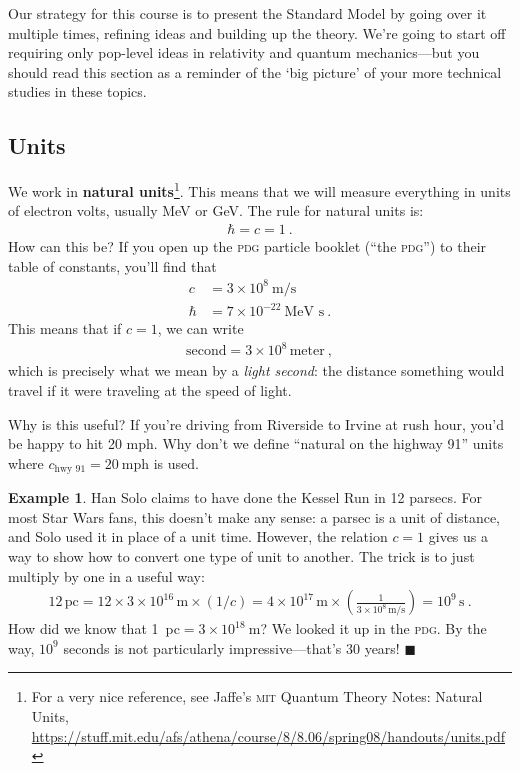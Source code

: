 \documentclass[12pt]{article}
\numberwithin{equation}{section}    %
\newcommand{\acro}[1]{\textsc{\MakeLowercase{#1}}}
\theoremstyle{definition}
\newtheorem{eg}[theorem]{Example}
\begin{document}
Our strategy for this course is to present the Standard Model by going over it multiple times, refining ideas and building up the theory. We're going to start off requiring only pop-level ideas in relativity and quantum mechanics---but you should read this section as a reminder of the `big picture' of your more technical studies in these topics.

\subsection{Units}

We work in \textbf{natural units}\footnote{For a very nice reference, see Jaffe's \acro{MIT} Quantum Theory Notes: Natural Units, \url{https://stuff.mit.edu/afs/athena/course/8/8.06/spring08/handouts/units.pdf}}. This means that we will measure everything in units of electron volts, usually MeV or GeV. The rule for natural units is:
\begin{align}
	\hbar = c = 1 \ .
\end{align}
How can this be? If you open up the \acro{PDG} particle booklet (``the \acro{PDG}'') to their table of constants, you'll find that
\begin{align}
	c & = 3 \times 10^8~\text{m}/\text{s}
	\\
	\hbar &= 7 \times 10^{-22}~\text{MeV~s} \ .
\end{align}
This means that if $c=1$, we can write
\begin{align}
	\text{second} = 3\times 10^8 \, \text{meter} \ ,
\end{align}
which is precisely what we mean by a \emph{light second}: the distance something would travel if it were traveling at the speed of light. 

Why is this useful? If you're driving from Riverside to Irvine at rush hour, you'd be happy to hit 20 mph. Why don't we define ``natural on the highway 91'' units where $c_\text{hwy 91} = 20~\text{mph}$ is used.

\begin{eg}
Han Solo claims to have done the Kessel Run in 12 parsecs. For most Star Wars fans, this doesn't make any sense: a parsec is a unit of distance, and Solo used it in place of a unit time. However, the relation $c=1$ gives us a way to show how to convert one type of unit to another. The trick is to just multiply by one in a useful way:
\begin{align}
	12\,\text{pc}
	= 12 \times 3 \times 10^{16}\,\text{m}\times (1/c)
	= 4\times 10^{17}\, \text{m}
	\times\left(\frac{1}{3\times 10^{8}\,\text{m}/\text{s}}\right)
	= 10^9\, \text{s} \ .
\end{align}
How did we know that 1~pc$= 3\times 10^{18}~$m? We looked it up in the \acro{PDG}. By the way, $10^9$ seconds is not particularly impressive---that's 30 years! $\blacksquare$
\end{eg}
\end{document}
